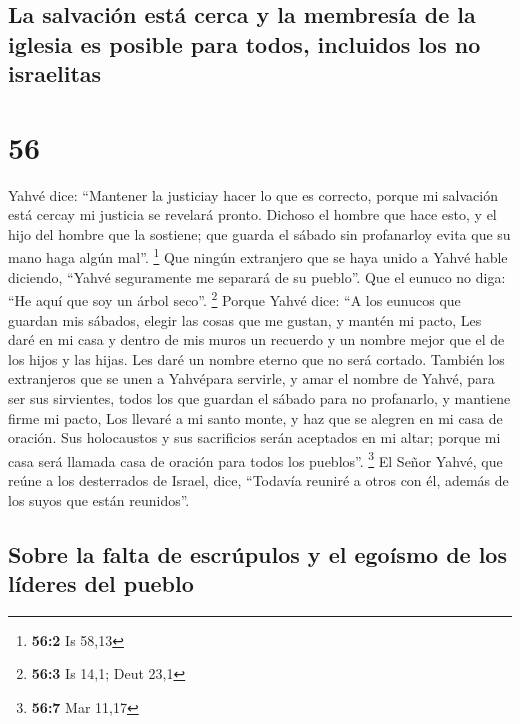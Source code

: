 \hypertarget{la-salvaciuxf3n-estuxe1-cerca-y-la-membresuxeda-de-la-iglesia-es-posible-para-todos-incluidos-los-no-israelitas}{%
\subsection{La salvación está cerca y la membresía de la iglesia es
posible para todos, incluidos los no
israelitas}\label{la-salvaciuxf3n-estuxe1-cerca-y-la-membresuxeda-de-la-iglesia-es-posible-para-todos-incluidos-los-no-israelitas}}

\hypertarget{section-55}{%
\section{56}\label{section-55}}

 Yahvé dice: ``Mantener la justiciay hacer lo que es
correcto, porque mi salvación está cercay mi justicia se revelará
pronto.  Dichoso el hombre que hace esto, y el hijo del
hombre que la sostiene; que guarda el sábado sin profanarloy evita que
su mano haga algún mal''. \footnote{\textbf{56:2} Is 58,13}
 Que ningún extranjero que se haya unido a Yahvé hable
diciendo, ``Yahvé seguramente me separará de su pueblo''. Que el eunuco
no diga: ``He aquí que soy un árbol seco''. \footnote{\textbf{56:3} Is
  14,1; Deut 23,1}  Porque Yahvé dice: ``A los eunucos que
guardan mis sábados, elegir las cosas que me gustan, y mantén mi pacto,
 Les daré en mi casa y dentro de mis muros un recuerdo y
un nombre mejor que el de los hijos y las hijas. Les daré un nombre
eterno que no será cortado.  También los extranjeros que
se unen a Yahvépara servirle, y amar el nombre de Yahvé, para ser sus
sirvientes, todos los que guardan el sábado para no profanarlo, y
mantiene firme mi pacto,  Los llevaré a mi santo monte, y
haz que se alegren en mi casa de oración. Sus holocaustos y sus
sacrificios serán aceptados en mi altar; porque mi casa será llamada
casa de oración para todos los pueblos''. \footnote{\textbf{56:7} Mar
  11,17}  El Señor Yahvé, que reúne a los desterrados de
Israel, dice, ``Todavía reuniré a otros con él, además de los suyos que
están reunidos''.

\hypertarget{sobre-la-falta-de-escruxfapulos-y-el-egouxedsmo-de-los-luxedderes-del-pueblo}{%
\subsection{Sobre la falta de escrúpulos y el egoísmo de los líderes del
pueblo}\label{sobre-la-falta-de-escruxfapulos-y-el-egouxedsmo-de-los-luxedderes-del-pueblo}}

